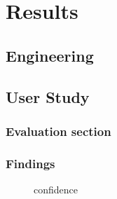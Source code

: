 \chapter{Results}
\label{chap:results}


\section{Engineering}

\section{User Study}

\subsection{Evaluation section}


\subsection{Findings}

\begin{figure}[htbp]
	\centering
	\scalebox{0.67}{}
	\vspace{-4em}
	\caption{confidence}
	\label{fig:question}
\end{figure}
